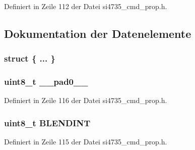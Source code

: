 Definiert in Zeile 112 der Datei si4735\+\_\+cmd\+\_\+prop.\+h.



\subsection{Dokumentation der Datenelemente}
\hypertarget{unionfm__rsq__status__resp1_a0869bb300ca173c595da4fa334c9897b}{}\subsubsection[{"@15}]{\setlength{\rightskip}{0pt plus 5cm}struct \{ ... \} }\label{unionfm__rsq__status__resp1_a0869bb300ca173c595da4fa334c9897b}
\hypertarget{unionfm__rsq__status__resp1_a8b4eebe79ded0459acec2f4950102ba3}{}
\subsubsection[{\+\_\+\+\_\+pad0\+\_\+\+\_\+}]{\setlength{\rightskip}{0pt plus 5cm}uint8\+\_\+t \+\_\+\+\_\+pad0\+\_\+\+\_\+}\label{unionfm__rsq__status__resp1_a8b4eebe79ded0459acec2f4950102ba3}


Definiert in Zeile 116 der Datei si4735\+\_\+cmd\+\_\+prop.\+h.

\hypertarget{unionfm__rsq__status__resp1_a321d37434c6c05e542b0a4efa740ef92}{}
\subsubsection[{B\+L\+E\+N\+D\+I\+N\+T}]{\setlength{\rightskip}{0pt plus 5cm}uint8\+\_\+t B\+L\+E\+N\+D\+I\+N\+T}\label{unionfm__rsq__status__resp1_a321d37434c6c05e542b0a4efa740ef92}


Definiert in Zeile 115 der Datei si4735\+\_\+cmd\+\_\+prop.\+h.

\hypertarget{unionfm__rsq__status__resp1_a96f44d20f1dbf1c8785a7bc99a46164c}{}
